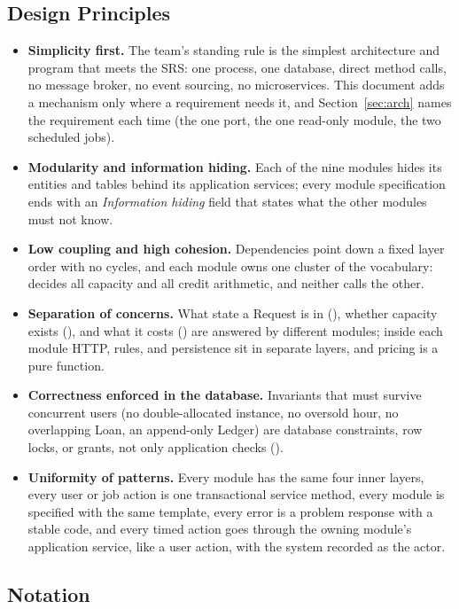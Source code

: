 \subsection{Design Principles}

\begin{itemize}
  \item \textbf{Simplicity first.} The team's standing rule is the simplest architecture and program that meets the SRS: one process, one database, direct method calls, no message broker, no event sourcing, no microservices. This document adds a mechanism only where a requirement needs it, and Section~\ref{sec:arch} names the requirement each time (the one port, the one read-only module, the two scheduled jobs).
  \item \textbf{Modularity and information hiding.} Each of the nine modules hides its entities and tables behind its application services; every module specification ends with an \emph{Information hiding} field that states what the other modules must not know.
  \item \textbf{Low coupling and high cohesion.} Dependencies point down a fixed layer order with no cycles, and each module owns one cluster of the vocabulary:  decides all capacity and  all credit arithmetic, and neither calls the other.
  \item \textbf{Separation of concerns.} What state a Request is in (), whether capacity exists (), and what it costs () are answered by different modules; inside each module HTTP, rules, and persistence sit in separate layers, and pricing is a pure function.
  \item \textbf{Correctness enforced in the database.} Invariants that must survive concurrent users (no double-allocated instance, no oversold hour, no overlapping Loan, an append-only Ledger) are database constraints, row locks, or grants, not only application checks ().
  \item \textbf{Uniformity of patterns.} Every module has the same four inner layers, every user or job action is one transactional service method, every module is specified with the same template, every error is a problem response with a stable code, and every timed action goes through the owning module's application service, like a user action, with the system recorded as the actor.
\end{itemize}

\subsection{Notation}

